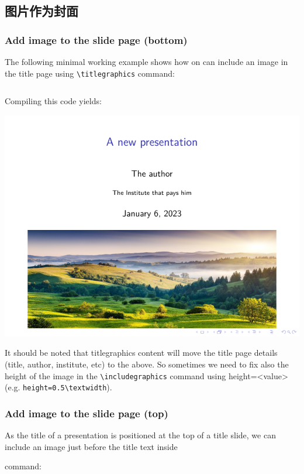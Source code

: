 \begin{column}{0.5\textwidth}
\subsection{图片作为封面}

\subsubsection{Add image to the slide page (bottom)}

The following minimal working example shows how on can include an image in the title page using \verb|\titlegraphics| command:

\inputminted[linenos=true]{latex}{examples/beamer/beamerfigure13.tex}

Compiling this code yields:

\includegraphics{examples/beamer/beamerfigure13.pdf}

It should be noted that titlegraphics content will move the title page details (title, author, institute, etc) to the above. So sometimes we need to fix also the height of the image in the \verb|\includegraphics| command using height=<value> (e.g. \verb|height=0.5\textwidth|).

\subsubsection{Add image to the slide page (top)}

As the title of a presentation is positioned at the top of a title slide, we can include an image just before the title text inside \title{} command:


\end{column}
